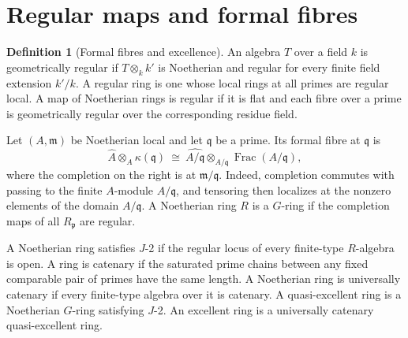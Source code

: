 \documentclass[11pt,oneside,openany]{book}
\theoremstyle{definition}
\newtheorem{definition}[theorem]{Definition}
\theoremstyle{remark}
\begin{document}
\section{Regular maps and formal fibres}

\begin{definition}[Formal fibres and excellence]\label{res:X01}
An algebra \(T\) over a field \(k\) is geometrically regular if \(T\otimes_k k'\) is Noetherian and regular for every finite field extension \(k'/k\). A regular ring is one whose local rings at all primes are regular local. A map of Noetherian rings is regular if it is flat and each fibre over a prime is geometrically regular over the corresponding residue field.

Let \((A,\mathfrak m)\) be Noetherian local and let \(\mathfrak q\) be a prime. Its formal fibre at \(\mathfrak q\) is
\[
 \widehat A\otimes_A\kappa(\mathfrak q)
  \ \cong\ \widehat{A/\mathfrak q}\otimes_{A/\mathfrak q}\operatorname{Frac}(A/\mathfrak q),
\]
where the completion on the right is at \(\mathfrak m/\mathfrak q\). Indeed, completion commutes with passing to the finite \(A\)-module \(A/\mathfrak q\), and tensoring then localizes at the nonzero elements of the domain \(A/\mathfrak q\). A Noetherian ring \(R\) is a \(G\)-ring if the completion maps of all \(R_{\mathfrak p}\) are regular.

A Noetherian ring satisfies \(J\)-2 if the regular locus of every finite-type \(R\)-algebra is open. A ring is catenary if the saturated prime chains between any fixed comparable pair of primes have the same length. A Noetherian ring is universally catenary if every finite-type algebra over it is catenary. A quasi-excellent ring is a Noetherian \(G\)-ring satisfying \(J\)-2. An excellent ring is a universally catenary quasi-excellent ring.
\end{definition}
\end{document}
